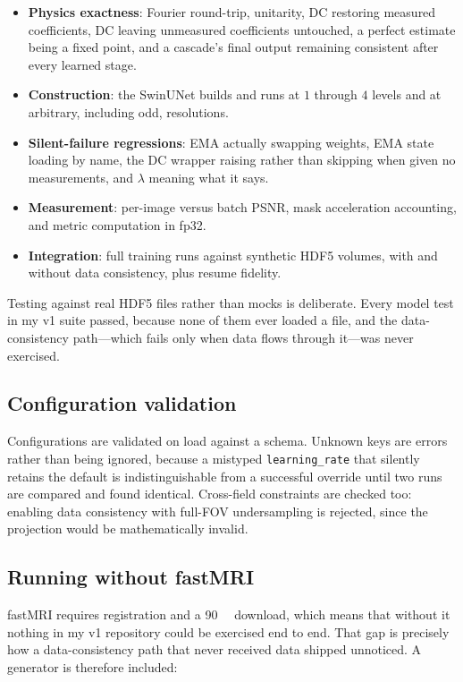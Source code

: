 \documentclass[11pt]{article}
\newcommand{\code}[1]{\texttt{\small #1}}
\begin{document}
\begin{itemize}
  \item \textbf{Physics exactness}: Fourier round-trip, unitarity, DC restoring
        measured coefficients, DC leaving unmeasured coefficients untouched, a
        perfect estimate being a fixed point, and a cascade's final output
        remaining consistent after every learned stage.
  \item \textbf{Construction}: the SwinUNet builds and runs at $1$ through $4$
        levels and at arbitrary, including odd, resolutions.
  \item \textbf{Silent-failure regressions}: EMA actually swapping weights, EMA
        state loading by name, the DC wrapper raising rather than skipping when
        given no measurements, and $\lambda$ meaning what it says.
  \item \textbf{Measurement}: per-image versus batch PSNR, mask acceleration
        accounting, and metric computation in fp32.
  \item \textbf{Integration}: full training runs against synthetic HDF5 volumes,
        with and without data consistency, plus resume fidelity.
\end{itemize}

Testing against real HDF5 files rather than mocks is deliberate. Every model
test in my v1 suite passed, because none of them ever loaded a file, and
the data-consistency path---which fails only when data flows through it---was
never exercised.

\subsection{Configuration validation}

Configurations are validated on load against a schema. Unknown keys are errors
rather than being ignored, because a mistyped \code{learning\_rate} that
silently retains the default is indistinguishable from a successful override
until two runs are compared and found identical. Cross-field constraints are
checked too: enabling data consistency with full-FOV undersampling is rejected,
since the projection would be mathematically invalid.

\subsection{Running without fastMRI}
\label{sec:protocol}

fastMRI requires registration and a \SI{90}{\giga\byte} download, which means
that without it nothing in my v1 repository could be exercised end to
end. That gap is precisely how a data-consistency path that never received data
shipped unnoticed. A generator is therefore included:
\end{document}
